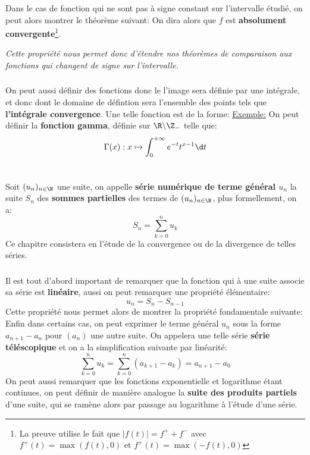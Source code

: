 \subsection*{}
Dans le cas de fonction qui ne sont pas à signe constant sur l'intervalle étudié, on peut alors montrer le théorème suivant:
On dira alors que \(f\) est \textbf{absolument convergente}\footnote[4]{La preuve utilise le fait que \(|f(t)| = f^+ + f^-\) avec \(f^+(t) = \max(f(t), 0)\) et \(f^+(t) = \max(-f(t), 0)\)}.
\begin{center}
   \textit{Cette propriété nous permet donc d'étendre nos théorèmes de comparaison aux fonctions qui changent de signe sur l'intervalle.}
\end{center}
\subsection*{}
On peut aussi définir des fonctions donc le l'image sera définie par une intégrale, et donc dont le domaine de défintion sera l'ensemble des points tels que \textbf{l'intégrale convergence}. Une telle fonction est de la forme:
\underline{Exemple:} On peut définir la \textbf{fonction gamma}, définie sur \(\R \backslash \Z_-\) telle que:
\[
   \Gamma(x): x \mapsto \int_{0}^{+\infty} e^{-t}t^{x-1} \d t   
\]


\chapter*{}
Soit \((u_n)_{n\in\N}\) une suite, on appelle \textbf{série numérique de terme général \(u_n\)} la suite \(S_n\) des \textbf{sommes partielles} des termes de \((u_n)_{n\in\N}\), plus formellement, on a:
\[
   S_n = \sum_{k=0}^{n} u_k   
\]
Ce chapitre consistera en l'étude de la convergence ou de la divergence de telles séries. 
\subsection*{}
Il est tout d'abord important de remarquer que la fonction qui à une suite associe sa série est \textbf{linéaire}, aussi on peut remarquer une propriété élémentaire:
\[
   u_n = S_{n} - S_{n-1}   
\]
Cette propriété nous permet alors de montrer la propriété fondamentale suivante:
Enfin dans certains cas, on peut exprimer le terme général \(u_n\) sous la forme \(a_{n+1} - a_n\) pour \((a_n)\) une autre suite. On appelera une telle série \textbf{série téléscopique} et on a la simplification suivante par linéarité:
\[
   \sum_{k=0}^{n} u_k = \sum_{k=0}^{n} (a_{k+1} - a_k) = a_{n+1} - a_0   
\]
On peut aussi remarquer que les fonctions exponentielle et logarithme étant continues, on peut définir de manière analogue la \textbf{suite des produits partiels} d'une suite, qui se ramène alors par passage au logarithme à l'étude d'une série.
